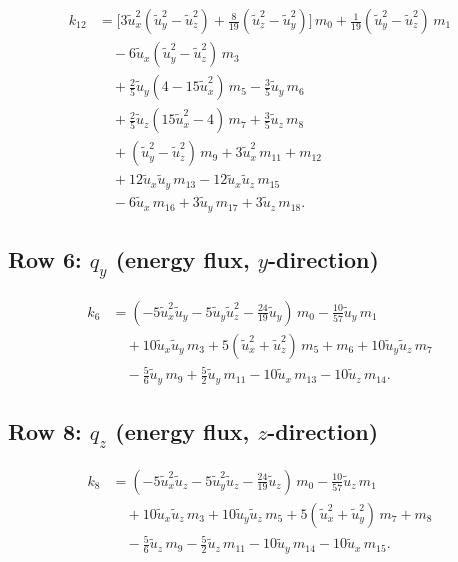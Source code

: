 \documentclass[11pt,a4paper]{article}
\newcommand{\tu}{\tilde{u}}
\begin{document}
\begin{align}
  k_{12} &= \bigl[3\tu_x^2(\tu_y^2 - \tu_z^2) + \tfrac{8}{19}(\tu_z^2 - \tu_y^2)\bigr]\,m_0 + \tfrac{1}{19}(\tu_y^2 - \tu_z^2)\,m_1 \nonumber\\
  &\quad - 6\tu_x(\tu_y^2 - \tu_z^2)\,m_3 \nonumber\\
  &\quad + \tfrac{2}{5}\tu_y(4 - 15\tu_x^2)\,m_5 - \tfrac{3}{5}\tu_y\,m_6 \nonumber\\
  &\quad + \tfrac{2}{5}\tu_z(15\tu_x^2 - 4)\,m_7 + \tfrac{3}{5}\tu_z\,m_8 \nonumber\\
  &\quad + (\tu_y^2 - \tu_z^2)\,m_9 + 3\tu_x^2\,m_{11} + m_{12} \nonumber\\
  &\quad + 12\tu_x\tu_y\,m_{13} - 12\tu_x\tu_z\,m_{15} \nonumber\\
  &\quad - 6\tu_x\,m_{16} + 3\tu_y\,m_{17} + 3\tu_z\,m_{18}. \label{eq:k12}
\end{align}

\subsection{Row 6: $q_y$ (energy flux, $y$-direction)}

\begin{align}
  k_6 &= (-5\tu_x^2\tu_y - 5\tu_y\tu_z^2 - \tfrac{24}{19}\tu_y)\,m_0
       - \tfrac{10}{57}\tu_y\,m_1 \nonumber\\
  &\quad + 10\tu_x\tu_y\,m_3 + 5(\tu_x^2 + \tu_z^2)\,m_5 + m_6
       + 10\tu_y\tu_z\,m_7 \nonumber\\
  &\quad - \tfrac{5}{6}\tu_y\,m_9 + \tfrac{5}{2}\tu_y\,m_{11}
       - 10\tu_x\,m_{13} - 10\tu_z\,m_{14}. \label{eq:k6}
\end{align}

\subsection{Row 8: $q_z$ (energy flux, $z$-direction)}

\begin{align}
  k_8 &= (-5\tu_x^2\tu_z - 5\tu_y^2\tu_z - \tfrac{24}{19}\tu_z)\,m_0
       - \tfrac{10}{57}\tu_z\,m_1 \nonumber\\
  &\quad + 10\tu_x\tu_z\,m_3 + 10\tu_y\tu_z\,m_5
       + 5(\tu_x^2 + \tu_y^2)\,m_7 + m_8 \nonumber\\
  &\quad - \tfrac{5}{6}\tu_z\,m_9 - \tfrac{5}{2}\tu_z\,m_{11}
       - 10\tu_y\,m_{14} - 10\tu_x\,m_{15}. \label{eq:k8}
\end{align}
\end{document}
